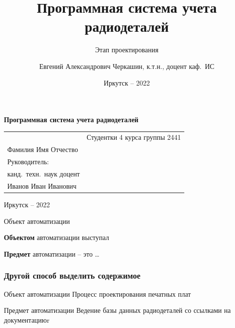 \documentclass{beamer}
\begin{document}
\title[Учет радиодеталей]{Программная система учета радиодеталей}
\subtitle{Этап проектирования}
\author[Е.~А.~Черкашин]{Евгений Александрович Черкашин, к.т.н., доцент каф.~ИС}
\date{Иркутск -- 2022}

\frame{\titlepage}

\begin{frame}
  \vfill
  \begin{block}{}
    \fontsize{20}{25}\selectfont \bfseries\centering
    \alert{Программная система учета радиодеталей}
  \end{block}
\vspace{3em}
\noindent\begin{tabularx}{\textwidth} {
  >{\raggedright\arraybackslash}X
  >{\raggedright}X }
&
Студентки 4 курса группы 2441\\
Фамилия Имя Отчество\\[0.3em]
Руководитель:\\
канд.~техн.~наук доцент\\
Иванов Иван Иванович
\end{tabularx}
\vfill
\begin{center}
  Иркутск -- 2022
\end{center}%
\end{frame}

\begin{frame}[fragile]{Объект автоматизации}

  \textbf{Объектом} автоматизации выступал

  \textbf{Предмет} автоматизации -- это \ldots

\end{frame}

\begin{frame}
  \frametitle{Другой способ выделить содержимое}

  \begin{block}{Объект автоматизации}
    Процесс проектирования печатных плат
  \end{block}

  \begin{alertblock}{Предмет автоматизации}
    Ведение базы данных радиодеталей со ссылками на документациюr
  \end{alertblock}
\end{frame}
\end{document}
